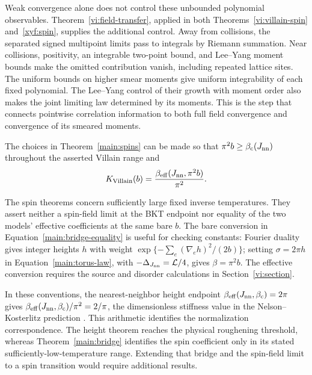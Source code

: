 Weak convergence alone does not control these unbounded polynomial
observables.  Theorem~\ref{vi:field-transfer}, applied in both
Theorems~\ref{vi:villain-spin} and~\ref{xyf:spin}, supplies the additional
control.  Away from collisions, the separated signed multipoint limits
pass to integrals by Riemann summation.  Near collisions, positivity,
an integrable two-point bound, and Lee--Yang moment bounds make the
omitted contribution vanish, including repeated lattice sites.
The uniform bounds on higher smear moments give uniform integrability
of each fixed polynomial.  The Lee--Yang control of their growth with
moment order also makes the joint limiting law determined by its
moments.  This is the step that connects pointwise correlation information
to both full field convergence and convergence of its smeared moments.

\begin{theorem}\label{main:bridge}
The choices in Theorem~\ref{main:spins} can be made so that
$\pi^2b\ge\beta_{\mathrm c}(J_{\mathrm{nn}})$ throughout the asserted Villain range and
\begin{equation}\label{main:bridge-equality}
 K_{\mathrm{Villain}}(b)
       =\frac{\beta_{\mathrm{eff}}(J_{\mathrm{nn}},\pi^2b)}{\pi^2}.
\end{equation}
\end{theorem}

The spin theorems concern sufficiently large fixed inverse temperatures.
They assert neither a spin-field limit at the BKT endpoint nor equality
of the two models' effective coefficients at the same bare $b$.
The bare conversion in Equation~\eqref{main:bridge-equality} is useful
for checking constants: Fourier duality gives integer heights $h$ with
weight $\exp\{-\sum_e(\nabla_eh)^2/(2b)\}$; setting $\sigma=2\pi h$
in Equation~\eqref{main:torus-law}, with
$-\Delta_{J_{\mathrm{nn}}}=\mathcal L/4$, gives $\beta=\pi^2b$.
The effective conversion requires the source and disorder calculations
in Section~\ref{vi:section}.

In these conventions, the nearest-neighbor height endpoint
$\beta_{\mathrm{eff}}(J_{\mathrm{nn}},\beta_{\mathrm c})=2\pi$ gives
$\beta_{\mathrm{eff}}(J_{\mathrm{nn}},\beta_{\mathrm c})/\pi^2=2/\pi$, the dimensionless stiffness value
in the Nelson--Kosterlitz prediction \citep{NelsonKosterlitz1977}.
This arithmetic identifies the normalization correspondence.  The
height theorem reaches the physical roughening threshold, whereas
Theorem~\ref{main:bridge} identifies the spin coefficient only in its
stated sufficiently-low-temperature range.  Extending that bridge and
the spin-field limit to a spin transition would require additional
results.


